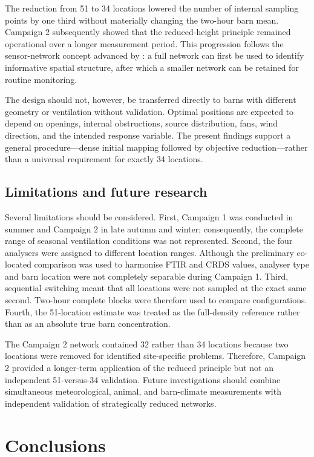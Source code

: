 \documentclass[12pt,a4paper]{article}
\begin{document}
The reduction from 51 to 34 locations lowered the number of internal sampling
points by one third without materially changing the two-hour barn mean.
Campaign 2 subsequently showed that the reduced-height principle remained
operational over a longer measurement period. This progression follows the
sensor-network concept advanced by \citet{Chen2026}: a full network can first
be used to identify informative spatial structure, after which a smaller
network can be retained for routine monitoring.

The design should not, however, be transferred directly to barns with
different geometry or ventilation without validation. Optimal positions are
expected to depend on openings, internal obstructions, source distribution,
fans, wind direction, and the intended response variable. The present
findings support a general procedure---dense initial mapping followed by
objective reduction---rather than a universal requirement for exactly 34
locations.

\subsection{Limitations and future research}

Several limitations should be considered. First, Campaign 1 was conducted in
summer and Campaign 2 in late autumn and winter; consequently, the complete
range of seasonal ventilation conditions was not represented. Second, the
four analysers were assigned to different location ranges. Although the
preliminary co-located comparison was used to harmonise FTIR and CRDS values,
analyser type and barn location were not completely separable during Campaign
1. Third, sequential switching meant that all locations were not sampled at
the exact same second. Two-hour complete blocks were therefore used to compare
configurations. Fourth, the 51-location estimate was treated as the
full-density reference rather than as an absolute true barn concentration.

The Campaign 2 network contained 32 rather than 34 locations because two
locations were removed for identified site-specific problems. Therefore,
Campaign 2 provided a longer-term application of the reduced principle but
not an independent 51-versus-34 validation. Future investigations should
combine simultaneous meteorological, animal, and barn-climate measurements
with independent validation of strategically reduced networks.

\section{Conclusions}
\end{document}
